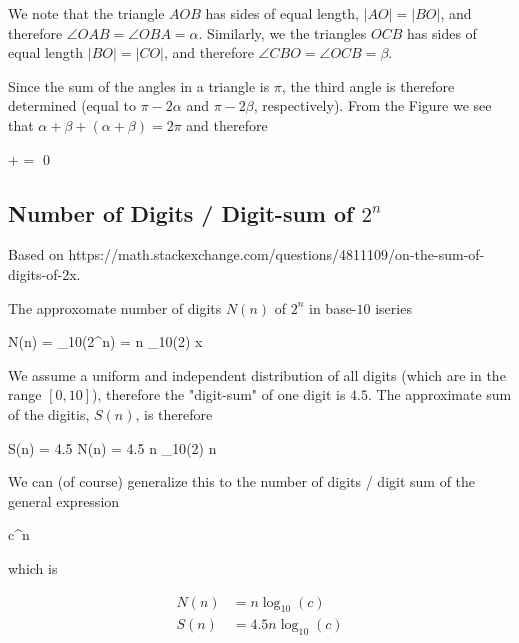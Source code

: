 We note that the triangle $AOB$ has sides of equal length, $|AO| = |BO|$, and therefore $\angle OAB = \angle OBA = \alpha$. Similarly, we the triangles $OCB$ has sides of equal length $|BO| = |CO|$, and therefore $\angle CBO = \angle OCB = \beta$.

Since the sum of the angles in a triangle is $\pi$, the third angle is therefore determined (equal to $\pi - 2\alpha$ and $\pi - 2 \beta$, respectively). From the Figure we see that $\alpha + \beta + (\alpha + \beta) = 2 \pi$ and therefore

\bee
\alpha + \beta = \pi \qed
\eee


\subsection{Number of Digits / Digit-sum of $2^n$}

Based on https://math.stackexchange.com/questions/4811109/on-the-sum-of-digits-of-2x.

The approxomate number of digits $N(n)$ of $2^n$ in base-$10$ iseries

\bee
N(n) = \log_{10}(2^n) = n \log_{10}(2)  x
\eee

We assume a uniform and independent distribution of all digits (which are in the range $[0,10]$), therefore the "digit-sum" of one digit is $4.5$. The approximate sum of the digitis, $S(n)$, is therefore

\bee
S(n) = 4.5 N(n) = 4.5 n \log_{10}(2)  n
\eee

We can (of course) generalize this to the number of digits / digit sum of the general expression

\bee
c^n
\eee

which is

\begin{align*}
N(n) &= n \log_{10}(c) \\
S(n) &= 4.5 n \log_{10}(c)
\end{align*}






